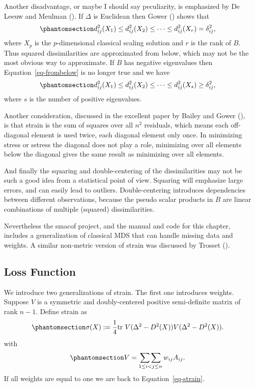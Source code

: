 \documentclass[
  12pt,
  letterpaper,
  DIV=11,
  numbers=noendperiod]{scrartcl}
\begin{document}
Another disadvantage, or maybe I should say peculiarity, is emphasized
by De Leeuw and Meulman (). If
\(\Delta\) is Euclidean then Gower () shows
that \begin{equation}\phantomsection\label{eq-frombelow}{
d_{ij}^2(X_1)\leq d_{ij}^2(X_2)\leq\cdots\leq d_{ij}^2(X_r)=\delta_{ij}^2,
}\end{equation} where \(X_p\) is the \(p\)-dimensional classical scaling
solution and \(r\) is the rank of \(B\). Thus squared dissimilarities
are approximated from below, which may not be the most obvious way to
approximate. If \(B\) has negative eigenvalues then
Equation~\ref{eq-frombelow} is no longer true and we have
\begin{equation}\phantomsection\label{eq-frombelowp}{
d_{ij}^2(X_1)\leq d_{ij}^2(X_2)\leq\cdots\leq d_{ij}^2(X_s)\geq\delta_{ij}^2,
}\end{equation} where \(s\) is the number of positive eigenvalues.

Another consideration, discussed in the excellent paper by Bailey and
Gower (), is that strain is the sum
of squares over all \(n^2\) residuals, which means each off-diagonal
element is used twice, each diagonal element only once. In minimizing
stress or sstress the diagonal does not play a role, minimizing over all
elements below the diagonal gives the same result as minimizing over all
elements.

And finally the squaring and double-centering of the dissimilarities may
not be such a good idea from a statistical point of view. Squaring will
emphasize large errors, and can easily lead to outliers.
Double-centering introduces dependencies between different observations,
because the pseudo scalar products in \(B\) are linear combinations of
multiple (squared) dissimilarities.

Nevertheless the smacof project, and the manual and code for this
chapter, includes a generalization of classical MDS that can handle
missing data and weights. A similar non-metric version of strain was
discussed by Trosset ().

\subsection{Loss Function}\label{loss-function}

We introduce two generalizations of strain. The first one introduces
weights. Suppose \(V\) is a symmetric and doubly-centered positive
semi-definite matrix of rank \(n-1\). Define strain as
\begin{equation}\phantomsection\label{eq-vstrain}{
\sigma(X):=\frac14\text{tr}\ V(\Delta^2-D^2(X))V(\Delta^2-D^2(X)).
}\end{equation} with
\begin{equation}\phantomsection\label{eq-vstraindef}{
V=\mathop{\sum\sum}_{1\leq i<j\leq n}w_{ij}A_{ij}.
}\end{equation} If all weights are equal to one we are back to
Equation~\ref{eq-strain}.
\end{document}
